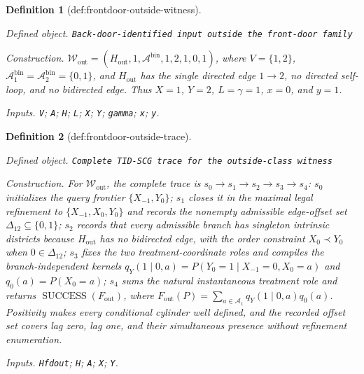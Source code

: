 \documentclass{article}
\newtheorem{definition}{Definition}
\begin{document}
\begin{definition}[def:frontdoor-outside-witness]\label{def:frontdoor-outside-witness}
\par\smallskip\noindent\emph{Defined object.} \texttt{Back-\allowbreak{}door-\allowbreak{}identified input outside the front-\allowbreak{}door family}
\par\smallskip\noindent\emph{Construction.} \(\mathcal W_{\mathrm{out}}=(H_{\mathrm{out}},1,\mathcal A^{\mathrm{bin}},1,2,1,0,1)\), where \(V=\{1,2\}\), \(\mathcal A^{\mathrm{bin}}_1=\mathcal A^{\mathrm{bin}}_2=\{0,1\}\), and \(H_{\mathrm{out}}\) has the single directed edge \(1\to2\), no directed self-loop, and no bidirected edge. Thus \(X=1\), \(Y=2\), \(L=\gamma=1\), \(x=0\), and \(y=1\).
\par\smallskip\noindent\emph{Inputs.} \texttt{V}; \texttt{A}; \texttt{H}; \texttt{L}; \texttt{X}; \texttt{Y}; \texttt{gamma}; \texttt{x}; \texttt{y}.
\end{definition}

\begin{definition}[def:frontdoor-outside-trace]\label{def:frontdoor-outside-trace}
\par\smallskip\noindent\emph{Defined object.} \texttt{Complete TID-\allowbreak{}SCG trace for the outside-\allowbreak{}class witness}
\par\smallskip\noindent\emph{Construction.} For \(\mathcal W_{\mathrm{out}}\), the complete trace is \(s_0\to s_1\to s_2\to s_3\to s_4\): \(s_0\) initializes the query frontier \(\{X_{-1},Y_0\}\); \(s_1\) closes it in the maximal legal refinement to \(\{X_{-1},X_0,Y_0\}\) and records the nonempty admissible edge-offset set \(\Delta_{12}\subseteq\{0,1\}\); \(s_2\) records that every admissible branch has singleton intrinsic districts because \(H_{\mathrm{out}}\) has no bidirected edge, with the order constraint \(X_0\prec Y_0\) when \(0\in\Delta_{12}\); \(s_3\) fixes the two treatment-coordinate roles and compiles the branch-independent kernels \(q_Y(1\mid0,a)=P(Y_0=1\mid X_{-1}=0,X_0=a)\) and \(q_0(a)=P(X_0=a)\); \(s_4\) sums the natural instantaneous treatment role and returns \(\operatorname{SUCCESS}(F_{\mathrm{out}})\), where \(F_{\mathrm{out}}(P)=\sum_{a\in\mathcal A_1}q_Y(1\mid0,a)q_0(a)\). Positivity makes every conditional cylinder well defined, and the recorded offset set covers lag zero, lag one, and their simultaneous presence without refinement enumeration.
\par\smallskip\noindent\emph{Inputs.} \texttt{Hfdout}; \texttt{H}; \texttt{A}; \texttt{X}; \texttt{Y}.
\end{definition}
\end{document}
